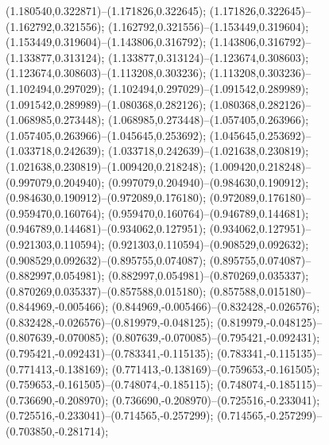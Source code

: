  (1.180540,0.322871)--(1.171826,0.322645);
 (1.171826,0.322645)--(1.162792,0.321556);
 (1.162792,0.321556)--(1.153449,0.319604);
 (1.153449,0.319604)--(1.143806,0.316792);
 (1.143806,0.316792)--(1.133877,0.313124);
 (1.133877,0.313124)--(1.123674,0.308603);
 (1.123674,0.308603)--(1.113208,0.303236);
 (1.113208,0.303236)--(1.102494,0.297029);
 (1.102494,0.297029)--(1.091542,0.289989);
 (1.091542,0.289989)--(1.080368,0.282126);
 (1.080368,0.282126)--(1.068985,0.273448);
 (1.068985,0.273448)--(1.057405,0.263966);
 (1.057405,0.263966)--(1.045645,0.253692);
 (1.045645,0.253692)--(1.033718,0.242639);
 (1.033718,0.242639)--(1.021638,0.230819);
 (1.021638,0.230819)--(1.009420,0.218248);
 (1.009420,0.218248)--(0.997079,0.204940);
 (0.997079,0.204940)--(0.984630,0.190912);
 (0.984630,0.190912)--(0.972089,0.176180);
 (0.972089,0.176180)--(0.959470,0.160764);
 (0.959470,0.160764)--(0.946789,0.144681);
 (0.946789,0.144681)--(0.934062,0.127951);
 (0.934062,0.127951)--(0.921303,0.110594);
 (0.921303,0.110594)--(0.908529,0.092632);
 (0.908529,0.092632)--(0.895755,0.074087);
 (0.895755,0.074087)--(0.882997,0.054981);
 (0.882997,0.054981)--(0.870269,0.035337);
 (0.870269,0.035337)--(0.857588,0.015180);
 (0.857588,0.015180)--(0.844969,-0.005466);
 (0.844969,-0.005466)--(0.832428,-0.026576);
 (0.832428,-0.026576)--(0.819979,-0.048125);
 (0.819979,-0.048125)--(0.807639,-0.070085);
 (0.807639,-0.070085)--(0.795421,-0.092431);
 (0.795421,-0.092431)--(0.783341,-0.115135);
 (0.783341,-0.115135)--(0.771413,-0.138169);
 (0.771413,-0.138169)--(0.759653,-0.161505);
 (0.759653,-0.161505)--(0.748074,-0.185115);
 (0.748074,-0.185115)--(0.736690,-0.208970);
 (0.736690,-0.208970)--(0.725516,-0.233041);
 (0.725516,-0.233041)--(0.714565,-0.257299);
 (0.714565,-0.257299)--(0.703850,-0.281714);
